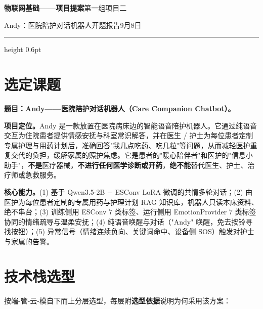 \documentclass[10pt,a4paper]{article}
\begin{document}
\noindent
{\Large\bfseries 物联网基础——项目提案}\hfill {\small 第一组\quad 项目二}\par
\vspace{1pt}
{\small Andy：医院陪护对话机器人}\hfill {\small 开题报告\quad 9月8日}\par
\vspace{-2pt}\hrule height 0.6pt
\vspace{4pt}

\section{选定课题}

\textbf{题目：Andy——医院陪护对话机器人（Care Companion Chatbot）。}

\textbf{项目定位。}Andy 是一款放置在医院病床边的智能语音陪护机器人。它通过纯语音交互为住院患者提供情感安抚与科室常识解答，并在医生 / 护士为每位患者定制专属护理与用药计划后，准确回答"我几点吃药、吃几粒"等问题，从而减轻医护重复交代的负担，缓解家属的照护焦虑。它是患者的"暖心陪伴者"和医护的"信息小助手"，\textbf{不是}医疗器械，\textbf{不进行任何医学诊断或开药}，\textbf{绝不能}替代医生、护士、治疗师或急救服务。

\textbf{核心能力。}(1) 基于 Qwen3.5-2B + ESConv LoRA 微调的共情多轮对话；(2) 由医护为每位患者定制的专属用药与护理计划 RAG 知识库，机器人只读本床资料、绝不串台；(3) 训练侧用 ESConv 7 类标签、运行侧用 EmotionProvider 7 类标签协同的情绪疏导与温柔安抚；(4) 纯语音唤醒与对话（"Andy" 唤醒，免去按铃寻找按钮）；(5) 异常信号（情绪连续负向、关键词命中、设备侧 SOS）触发对护士与家属的告警。

\section{技术栈选型}

按端-管-云-模自下而上分层选型，每层附\textbf{选型依据}说明为何采用该方案：
\end{document}
